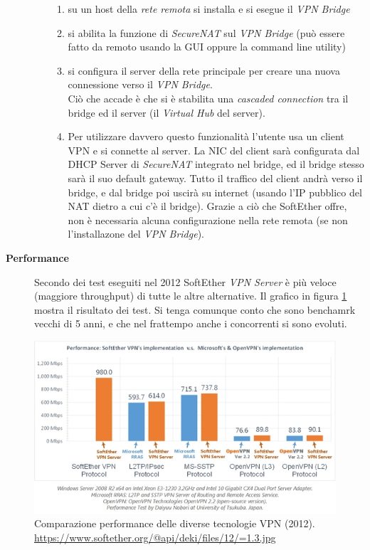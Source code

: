\begin{description}
\begin{itemize}
\begin{enumerate}
      \item su un host della \textit{rete remota} si installa e si esegue il \textit{VPN Bridge}
      \item si abilita la funzione di \textit{SecureNAT} sul \textit{VPN Bridge} (può essere fatto da remoto
      usando la GUI oppure la command line utility)
      \item si configura il server della rete principale per creare una nuova connessione verso il \textit{VPN Bridge}.\\
      Ciò che accade è che si è stabilita una \textit{cascaded connection} tra il bridge ed il server (il \textit{Virtual Hub}
      del server).
      \item Per utilizzare davvero questo funzionalità l'utente usa un client VPN e si connette al server. La NIC
      del client sarà configurata dal DHCP Server di \textit{SecureNAT} integrato nel bridge,
      ed il bridge stesso sarà il suo default gateway. Tutto il traffico del client andrà verso il bridge, e dal bridge poi
      uscirà su internet (usando l'IP pubblico del NAT dietro a cui c'è il bridge). Grazie a ciò che SoftEther offre,
      non è necessaria alcuna configurazione nella rete remota (se non l'installazone del \textit{VPN Bridge}).
    \end{enumerate}
  \end{itemize}
  \item[\textbf{Performance}]Secondo dei test eseguiti nel 2012 SoftEther \textit{VPN Server} è più veloce (maggiore throughput) di tutte le
  altre alternative. Il grafico in figura \ref{fig:softether-performance} mostra il risultato dei test. Si tenga comunque
  conto che sono benchamrk vecchi di 5 anni, e che nel frattempo anche i concorrenti si sono evoluti.
\end{description}
\begin{figure}
  \includegraphics[scale=0.4]{img/softether_perf}
  \caption[Comparazione performance delle diverse tecnologie VPN]{
    Comparazione performance delle diverse tecnologie VPN (2012).
    \url{https://www.softether.org/@api/deki/files/12/=1.3.jpg}}
  \label{fig:softether-performance}
\end{figure}

